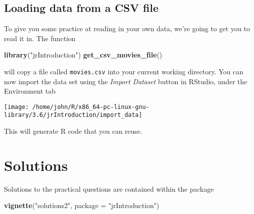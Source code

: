 \documentclass[]{tufte-handout}
\newenvironment{Shaded}{}{}
\newcommand{\DataTypeTok}[1]{\textcolor[rgb]{0.56,0.13,0.00}{#1}}
\newcommand{\KeywordTok}[1]{\textcolor[rgb]{0.00,0.44,0.13}{\textbf{#1}}}
\newcommand{\NormalTok}[1]{#1}
\newcommand{\StringTok}[1]{\textcolor[rgb]{0.25,0.44,0.63}{#1}}
\begin{document}
\hypertarget{loading-data-from-a-csv-file}{%
\subsection{Loading data from a CSV
file}\label{loading-data-from-a-csv-file}}

To give you some practice at reading in your own data, we're going to
get you to read it in. The function

\begin{Shaded}
\begin{Highlighting}[]
\KeywordTok{library}\NormalTok{(}\StringTok{"jrIntroduction"}\NormalTok{)}
\KeywordTok{get_csv_movies_file}\NormalTok{()}
\end{Highlighting}
\end{Shaded}

\noindent will copy a file called \texttt{movies.csv} into your current
working directory. You can now import the data set using the
\emph{Import Dataset} button in RStudio, under the Environment tab

\texttt{[image: /home/john/R/x86\_64-pc-linux-gnu-library/3.6/jrIntroduction/import\_data]}

\noindent This will generate R code that you can reuse.

\hypertarget{solutions}{%
\section{Solutions}\label{solutions}}

Solutions to the practical questions are contained within the package

\begin{Shaded}
\begin{Highlighting}[]
\KeywordTok{vignette}\NormalTok{(}\StringTok{"solutions2"}\NormalTok{, }\DataTypeTok{package =} \StringTok{"jrIntroduction"}\NormalTok{)}
\end{Highlighting}
\end{Shaded}
\end{document}
